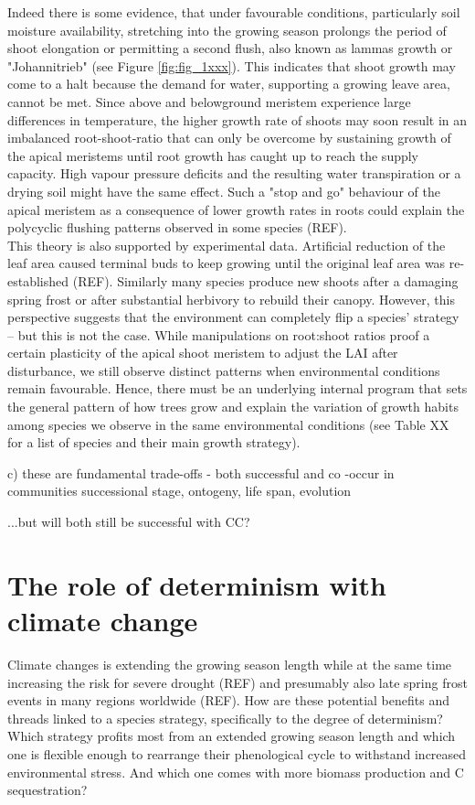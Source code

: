 \documentclass{article}
\begin{document}
Indeed there is some evidence, that under favourable conditions, particularly soil moisture availability,  stretching into the growing season prolongs the period of shoot elongation or permitting a second flush, also known as lammas growth or "Johannitrieb" (see Figure \ref{fig:fig_1xxx}). This indicates that shoot growth may come to a halt because the demand for water, supporting a growing leave area, cannot be met. Since above and belowground meristem experience large differences in temperature, the higher growth rate of shoots may soon result in an imbalanced root-shoot-ratio that can only be overcome by sustaining growth of the apical meristems until root growth has caught up to reach the supply capacity. High vapour pressure deficits and the resulting water transpiration or a drying soil might have the same effect. Such a "stop and go" behaviour of the apical meristem as a  consequence of lower growth rates in roots could explain the polycyclic flushing patterns observed in some species (REF).\\

This theory is also supported by experimental data. Artificial reduction of the leaf area caused terminal buds to keep growing until the original leaf area was re-established (REF). Similarly many species produce new shoots after a damaging spring frost or after substantial herbivory to rebuild their canopy. However, this perspective suggests that the environment can completely flip a species' strategy -- but this is not the case. While manipulations on root:shoot ratios proof a certain plasticity of the apical shoot meristem to adjust the LAI after disturbance, we still observe distinct patterns when environmental conditions remain favourable. Hence, there must be an underlying internal program that sets the general pattern of how trees grow and explain the variation of growth habits among species we observe in the same environmental conditions (see Table XX for a list of species and their main growth strategy). 

	c) these are fundamental trade-offs - both successful and co -occur in communities
	successional stage, ontogeny, life span, evolution
	
	...but will both still be successful with CC?
	
\section*{The role of determinism with climate change }
Climate changes is extending the growing season length while at the same time increasing the risk for severe drought (REF) and presumably also late spring frost events in many regions worldwide (REF). How are these potential benefits and threads linked to a species strategy, specifically to the degree of determinism? Which strategy profits most from an extended growing season length and which one is flexible enough to rearrange their phenological cycle to withstand increased environmental stress. And which one comes with more biomass production and C sequestration?
\end{document}
